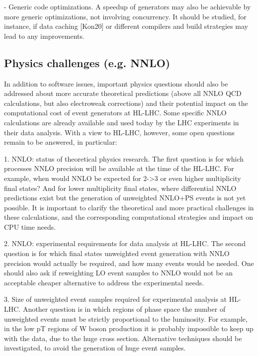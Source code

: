 \documentclass[11pt,a4paper]{article}
\begin{document}
- {Generic code optimizations}. A speedup of generators may also be
achievable by more generic optimizations, not involving concurrency. It
should be studied, for instance, if data caching {[}Kon20{]} or
different compilers and build strategies may lead to any improvements.

\hypertarget{physics-challenges-e.g.-nnlo}{%
\subsection{Physics challenges (e.g.
NNLO)}\label{physics-challenges-e.g.-nnlo}}

In addition to software issues, important physics questions should also
be addressed about more accurate theoretical predictions (above all NNLO
QCD calculations, but also electroweak corrections) and their potential
impact on the computational cost of event generators at HL-LHC. Some
specific NNLO calculations are already available and used today by the
LHC experiments in their data analysis. With a view to HL-LHC, however,
some open questions remain to be answered, in particular:

1. {NNLO: status of theoretical physics research}. The first question is
for which processes NNLO precision will be available at the time of the
HL-LHC. For example, when would NNLO be expected for 2-\textgreater3 or
even higher multiplicity final states? And for lower multiplicity final
states, where differential NNLO predictions exist but the generation of
unweighted NNLO+PS events is not yet possible. It is important to
clarify the theoretical and more practical challenges in these
calculations, and the corresponding computational strategies and impact
on CPU time needs.

2. {NNLO: experimental requirements for data analysis at HL-LHC}. The
second question is for which final states unweighted event generation
with NNLO precision would actually be required, and how many events
would be needed. One should also ask if reweighting LO event samples to
NNLO would not be an acceptable cheaper alternative to address the
experimental needs.

3. {Size of unweighted event samples required for experimental analysis
at HL-LHC}. Another question is in which regions of phase space the
number of unweighted events must be strictly proportional to the
luminosity. For example, in the low pT regions of W boson production it
is probably impossible to keep up with the data, due to the huge cross
section. Alternative techniques should be investigated, to avoid the
generation of huge event samples.
\end{document}
